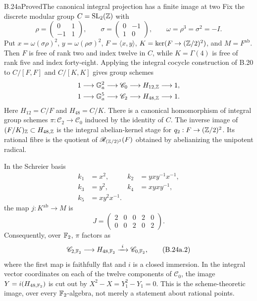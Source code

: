 \begin{statement}{B.24a}{Proved}{The canonical integral projection has a finite image at two}
Fix the discrete modular group $C=\mathrm{SL}_2(\mathbb Z)$ with
\[
 \rho=\begin{pmatrix}0&1\\-1&1\end{pmatrix},\qquad
 \sigma=\begin{pmatrix}0&-1\\1&0\end{pmatrix},\qquad
 \omega=\rho^3=\sigma^2=-I.
\]
Put $x=\omega(\sigma\rho)^2$, $y=\omega(\rho\sigma)^2$,
$F=\langle x,y\rangle$, $K=\ker(F\to(\mathbb Z/2)^2)$, and
$M=F^{\mathrm{ab}}$.  Then $F$ is free of rank two and index
twelve in $C$, while $K=\Gamma(4)$ is free of rank five and
index forty-eight.  Applying the integral cocycle construction of
B.20 to $C/[F,F]$ and $C/[K,K]$ gives group schemes
\[
\begin{split}
 1&\longrightarrow\mathbb G_a^2\longrightarrow\mathscr C_0
       \longrightarrow H_{12,\mathbb Z}\longrightarrow1,\\
 1&\longrightarrow\mathbb G_a^5\longrightarrow\mathscr C_2
       \longrightarrow H_{48,\mathbb Z}\longrightarrow1.
\end{split}
\]
Here $H_{12}=C/F$ and $H_{48}=C/K$.
There is a canonical homomorphism of integral group schemes
$\pi:\mathscr C_2\to\mathscr C_0$ induced by the identity of $C$.
The inverse image of $(F/K)_\mathbb Z\subset H_{48,\mathbb Z}$ is the integral
abelian-kernel stage for $q_2:F\to(\mathbb Z/2)^2$.  Its rational fibre is
the quotient of $\mathscr R_{(\mathbb Z/2)^2}(F)$ obtained by abelianizing
the unipotent radical.

In the Schreier basis
\[
\begin{aligned}
 k_1&=x^2,& k_2&=yxy^{-1}x^{-1},\\
 k_3&=y^2,& k_4&=xyxy^{-1},\\
 k_5&=xy^2x^{-1}.
\end{aligned}
\]
the map $j:K^{\mathrm{ab}}\to M$ is
\[
 J=\begin{pmatrix}2&0&0&2&0\\0&0&2&0&2\end{pmatrix}.
 \tag{B.24a.1}
\]
Consequently, over $\mathbb F_2$, $\pi$ factors as
\[
 \mathscr C_{2,\mathbb F_2}\longrightarrow H_{48,\mathbb F_2}
       \xrightarrow{\ i\ }\mathscr C_{0,\mathbb F_2},
 \tag{B.24a.2}
\]
where the first map is faithfully flat and $i$ is a closed immersion.
In the integral vector coordinates on each of the twelve components of
$\mathscr C_0$, the image $Y=i(H_{48,\mathbb F_2})$ is cut out by
$X^2-X=Y_1^2-Y_1=0$.  This is the scheme-theoretic image, over every
$\mathbb F_2$-algebra, not merely a statement about rational points.
\end{statement}
